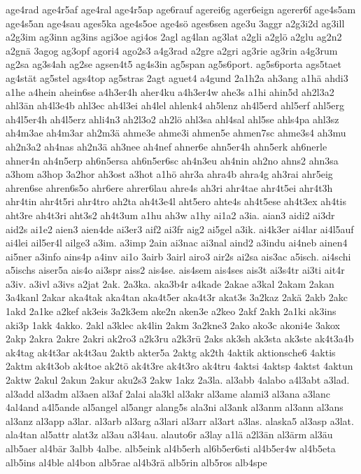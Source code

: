 {age4rad
age4r5af
age4ral
age4r5ap
age6rauf
agerei6g
ager6eign
agerer6f
age4s5am
age4s5an
age4sau
ages5ka
age4s5oe
age4sö
ages6sen
age3u
3aggr
a2g3i2d
ag3ill
a2g3im
ag3inn
ag3ins
agi3oe
agi4os
2agl
ag4lan
ag3lat
a2gli
a2glö
a2glu
ag2n2
a2gnä
3agog
ag3opf
agori4
ago2s3
a4g3rad
a2gre
a2gri
ag3rie
ag3rin
a4g3rum
ag2sa
ag3s4ah
ag2se
agsen4t5
ag4s3in
ag5span
ag5s6port.
ag5s6porta
ags5taet
ag4stät
ag5stel
ags4top
ag5stras
2agt
aguet4
a4gund
2a1h2a
ah3ang
a1hä
ahdi3
a1he
a4hein
ahein6se
a4h3er4h
aher4ku
a4h3er4w
ahe3s
a1hi
ahin5d
ah2l3a2
ahl3än
ah4l3e4b
ahl3ec
ah4l3ei
ah4lel
ahlenk4
ah5lenz
ah4l5erd
ahl5erf
ahl5erg
ah4l5er4h
ah4l5erz
ahli4n3
ah2l3o2
ah2lö
ahl3sa
ahl4sal
ahl5se
ahls4pa
ahl3sz
ah4m3ae
ah4m3ar
ah2m3ä
ahme3e
ahme3i
ahmen5e
ahmen7sc
ahme3s4
ah3mu
ah2n3a2
ah4nas
ah2n3ä
ah3nee
ah4nef
ahner6e
ahn5er4h
ahn5erk
ah6nerle
ahner4n
ah4n5erp
ah6n5ersa
ah6n5er6sc
ah4n3eu
ah4nin
ah2no
ahns2
ahn3sa
a3hom
a3hop
3a2hor
ah3ost
a3hot
a1hö
ahr3a
ahra4b
ahra4g
ah3rai
ahr5eig
ahren6se
ahren6s5o
ahr6ere
ahrer6lau
ahre4s
ah3ri
ahr4tae
ahr4t5ei
ahr4t3h
ahr4tin
ahr4t5ri
ahr4tro
ah2ta
ah4t3e4l
aht5ero
ahte4s
ah4t5ese
ah4t3ex
ah4tis
aht3re
ah4t3ri
aht3s2
ah4t3um
a1hu
ah3w
a1hy
ai1a2
a3ia.
aian3
aidi2
ai3dr
aid2s
ai1e2
aien3
aien4de
ai3er3
aif2
ai3fr
aig2
ai5gel
a3ik.
ai4k3er
ai4lar
ai4l5auf
ai4lei
ail5er4l
ailge3
a3im.
a3imp
2ain
ai3nac
ai3nal
aind2
a3indu
ai4neb
ainen4
ai5ner
a3info
ains4p
a4inv
ai1o
3airb
3airl
airo3
air2s
ai2sa
ais3ac
a5isch.
ai4schi
a5ischs
aiser5a
ais4o
ai3spr
aiss2
ais4se.
ais4sem
ais4ses
ais3t
ai3s4tr
ai3ti
ait4r
a3iv.
a3ivl
a3ivs
a2jat
2ak.
2a3ka.
aka3b4r
a4kade
2akae
a3kal
2akam
2akan
3a4kanl
2akar
aka4tak
aka4tan
aka4t5er
aka4t3r
akat3s
3a2kaz
2akä
2akb
2akc
1akd
2a1ke
a2kef
ak3eis
3a2k3em
ake2n
aken3e
a2keo
2akf
2akh
2a1ki
ak3ins
aki3p
1akk
4akko.
2akl
a3klec
ak4lin
2akm
3a2kne3
2ako
ako3c
akoni4e
3akox
2akp
2akra
2akre
2akri
ak2ro3
a2k3ru
a2k3rü
2aks
ak3sh
ak3sta
ak3ste
ak4t3a4b
ak4tag
ak4t3ar
ak4t3au
2aktb
akter5a
2aktg
ak2th
4aktik
aktionsche6
4aktis
2aktm
ak4t3ob
ak4toe
ak2tö
ak4t3re
ak4t3ro
ak4tru
4aktsi
4aktsp
4aktst
4aktun
2aktw
2akul
2akun
2akur
aku2s3
2akw
1akz
2a3la.
al3abb
4alabo
a4l3abt
a3lad.
al3add
al3adm
al3aen
al3af
2alai
ala3kl
al3akr
al3ame
alami3
al3ana
a3lanc
4al4and
a4l5ande
al5angel
al5angr
alang5s
ala3ni
al3ank
al3anm
al3ann
al3ans
al3anz
al3app
a3lar.
al3arb
al3arg
a3lari
al3arr
al3art
a3las.
alaska5
al3asp
a3lat.
ala4tan
al5attr
alat3z
al3au
a3l4au.
alauto6r
a3lay
a1lä
a2l3än
al3ärm
al3äu
alb5aer
al4bär
3albb
4albe.
alb5eink
al4b5erh
al6b5er6sti
al4b5er4w
al4b5eta
alb5ins
al4ble
al4bon
alb5rae
al4b3rä
alb5rin
alb5ros
alb4spe
}
